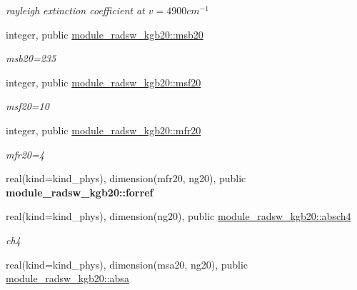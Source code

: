 \begin{Indent}
\begin{DoxyCompactItemize}
\begin{DoxyCompactList}\small\item\em rayleigh extinction coefficient at $v=4900cm^{-1}$ \end{DoxyCompactList}\item 
integer, public \hyperlink{group__module__radsw__kgbnn_ga385f5b8c61ed1de7aa3bbb6bd65f522f}{module\+\_\+radsw\+\_\+kgb20\+::msb20}
\begin{DoxyCompactList}\small\item\em msb20=235 \end{DoxyCompactList}\item 
integer, public \hyperlink{group__module__radsw__kgbnn_ga925dc2da02eef4edcf000a14525a7c7e}{module\+\_\+radsw\+\_\+kgb20\+::msf20}
\begin{DoxyCompactList}\small\item\em msf20=10 \end{DoxyCompactList}\item 
integer, public \hyperlink{group__module__radsw__kgbnn_ga9c7964eeb3acb4a11757fce977b73022}{module\+\_\+radsw\+\_\+kgb20\+::mfr20}
\begin{DoxyCompactList}\small\item\em mfr20=4 \end{DoxyCompactList}\item 
real(kind=kind\+\_\+phys), dimension(mfr20, ng20), public {\bfseries module\+\_\+radsw\+\_\+kgb20\+::forref}
\item 
real(kind=kind\+\_\+phys), dimension(ng20), public \hyperlink{group__module__radsw__kgbnn_ga1757aee0ec8211f84e2c9334cc9b0f9d}{module\+\_\+radsw\+\_\+kgb20\+::absch4}
\begin{DoxyCompactList}\small\item\em ch4 \end{DoxyCompactList}\item 
real(kind=kind\+\_\+phys), dimension(msa20, ng20), public \hyperlink{group__module__radsw__kgbnn_ga405eabf194b1216dd083c2344e80f5b4}{module\+\_\+radsw\+\_\+kgb20\+::absa}

\end{DoxyCompactItemize}
\end{Indent}
